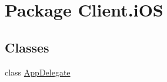 \hypertarget{namespaceClient_1_1iOS}{\section{Package Client.\-i\-O\-S}
\label{namespaceClient_1_1iOS}
}
\subsection*{Classes}
\begin{DoxyCompactItemize}
\item 
class \hyperlink{classClient_1_1iOS_1_1AppDelegate}{App\-Delegate}
\end{DoxyCompactItemize}
